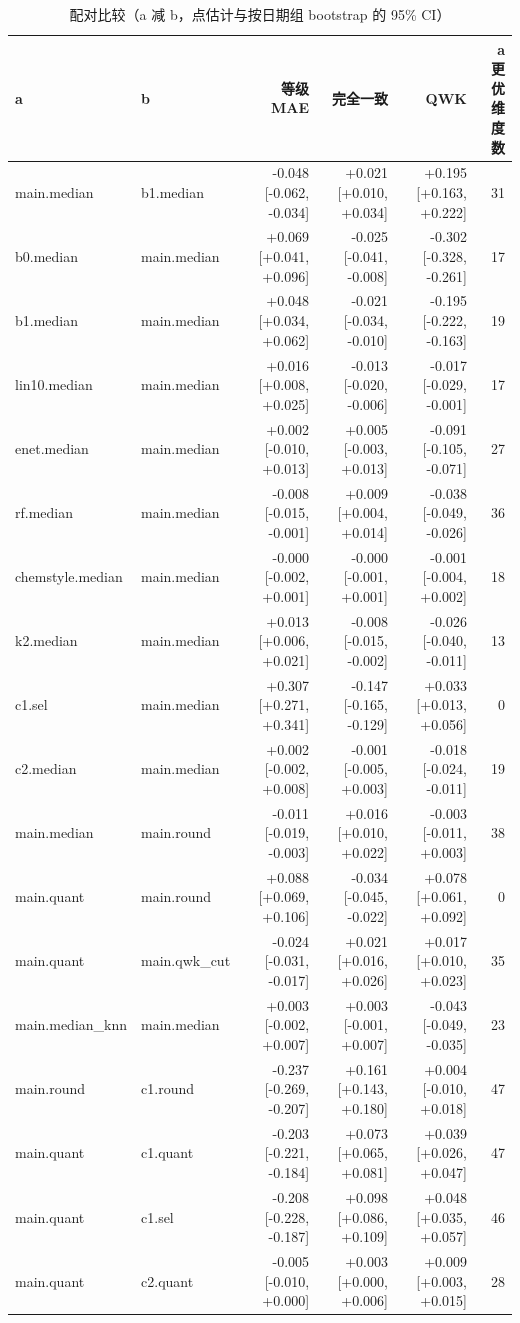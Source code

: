 \begin{table}[htbp]
\centering
\caption{配对比较（a 减 b，点估计与按日期组 bootstrap 的 95\% CI）}\label{tab:q1_paired}
\begin{tabular}{llrrrr}
\toprule
a & b & 等级 MAE & 完全一致 & QWK & a 更优维度数 \\
\midrule
main.median & b1.median & -0.048 [-0.062, -0.034] & +0.021 [+0.010, +0.034] & +0.195 [+0.163, +0.222] & 31 \\
b0.median & main.median & +0.069 [+0.041, +0.096] & -0.025 [-0.041, -0.008] & -0.302 [-0.328, -0.261] & 17 \\
b1.median & main.median & +0.048 [+0.034, +0.062] & -0.021 [-0.034, -0.010] & -0.195 [-0.222, -0.163] & 19 \\
lin10.median & main.median & +0.016 [+0.008, +0.025] & -0.013 [-0.020, -0.006] & -0.017 [-0.029, -0.001] & 17 \\
enet.median & main.median & +0.002 [-0.010, +0.013] & +0.005 [-0.003, +0.013] & -0.091 [-0.105, -0.071] & 27 \\
rf.median & main.median & -0.008 [-0.015, -0.001] & +0.009 [+0.004, +0.014] & -0.038 [-0.049, -0.026] & 36 \\
chemstyle.median & main.median & -0.000 [-0.002, +0.001] & -0.000 [-0.001, +0.001] & -0.001 [-0.004, +0.002] & 18 \\
k2.median & main.median & +0.013 [+0.006, +0.021] & -0.008 [-0.015, -0.002] & -0.026 [-0.040, -0.011] & 13 \\
c1.sel & main.median & +0.307 [+0.271, +0.341] & -0.147 [-0.165, -0.129] & +0.033 [+0.013, +0.056] & 0 \\
c2.median & main.median & +0.002 [-0.002, +0.008] & -0.001 [-0.005, +0.003] & -0.018 [-0.024, -0.011] & 19 \\
main.median & main.round & -0.011 [-0.019, -0.003] & +0.016 [+0.010, +0.022] & -0.003 [-0.011, +0.003] & 38 \\
main.quant & main.round & +0.088 [+0.069, +0.106] & -0.034 [-0.045, -0.022] & +0.078 [+0.061, +0.092] & 0 \\
main.quant & main.qwk\_cut & -0.024 [-0.031, -0.017] & +0.021 [+0.016, +0.026] & +0.017 [+0.010, +0.023] & 35 \\
main.median\_knn & main.median & +0.003 [-0.002, +0.007] & +0.003 [-0.001, +0.007] & -0.043 [-0.049, -0.035] & 23 \\
main.round & c1.round & -0.237 [-0.269, -0.207] & +0.161 [+0.143, +0.180] & +0.004 [-0.010, +0.018] & 47 \\
main.quant & c1.quant & -0.203 [-0.221, -0.184] & +0.073 [+0.065, +0.081] & +0.039 [+0.026, +0.047] & 47 \\
main.quant & c1.sel & -0.208 [-0.228, -0.187] & +0.098 [+0.086, +0.109] & +0.048 [+0.035, +0.057] & 46 \\
main.quant & c2.quant & -0.005 [-0.010, +0.000] & +0.003 [+0.000, +0.006] & +0.009 [+0.003, +0.015] & 28 \\
\bottomrule
\end{tabular}
\end{table}
